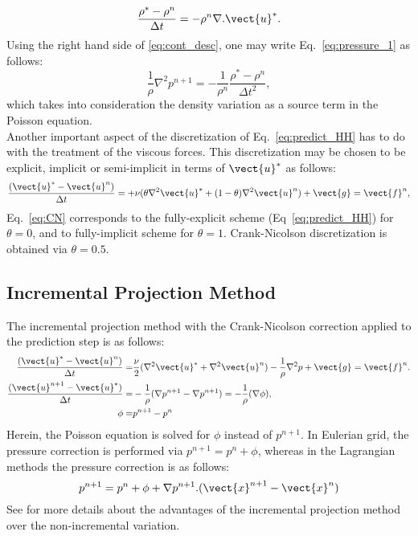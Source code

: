 \begin{equation}\label{eq:cont_desc}
\dfrac{\rho^*-\rho^n}{\Delta t}=-\rho^n \nabla.\vect{u}^*.
\end{equation}
Using the right hand side of \ref{eq:cont_desc}, one may write  Eq.~\ref{eq:pressure_1} as follows:
\begin{equation}\label{eq:pressure_2}
\dfrac{1}{\rho} \nabla^2 p^{n+1}=-\dfrac{1}{\rho^n}\dfrac{\rho^*-\rho^n}{\Delta t^2},
\end{equation}
which takes into consideration the density variation as a source term in the Poisson equation.\\


Another important aspect of the discretization of Eq.~\ref{eq:predict_HH} has to do with the treatment of the viscous forces. This discretization may be chosen to be explicit, implicit or semi-implicit in terms of $\vect{u}^*$  as follows:	
\begin{equation}
\dfrac{(\vect{u}^*-\vect{u}^n)}{\Delta t}=+\nu(\theta \nabla^2\vect{u}^* + (1-\theta)\nabla^2\vect{u}^n)+ \vect{g}=\vect{f}^n\label{eq:CN},
\end{equation}
Eq.~\ref{eq:CN} corresponds to the fully-explicit scheme (Eq~\ref{eq:predict_HH}) for $\theta=0$, and to fully-implicit scheme for $\theta=1$. Crank-Nicolson discretization is obtained via $\theta=0.5$.

\subsection{Incremental Projection Method}
The incremental projection method with the Crank-Nicolson correction applied to the prediction step is as follows:
\begin{align}
\dfrac{(\vect{u}^*-\vect{u}^n)}{\Delta t}=&\frac{\nu}{2}(\nabla^2\vect{u}^* +\nabla^2\vect{u}^n) -\dfrac{1}{\rho} \nabla^2 p+ \vect{g}=\vect{f}^n\label{eq:CN}.\\
\dfrac{(\vect{u}^{n+1}-\vect{u}^*)}{\Delta t}=&-\dfrac{1}{\rho} (\nabla p^{n+1}-\nabla p^{n+1} )=-\dfrac{1}{\rho} (\nabla \phi ) \label{eq:correct_inc},\\
\phi=&p^{n+1}-p^{n}
\end{align}
Herein, the Poisson equation is solved for $\phi$ instead of $p^{n+1}$. In Eulerian grid, the pressure correction is performed via $p^{n+1}=p^{n}+\phi$, whereas in the Lagrangian methods the pressure correction is as follows:
\begin{equation}
p^{n+1}=p^{n}+\phi +\nabla p^{n+1}.(\vect{x}^{n+1}-\vect{x}^{n})
\end{equation}
See \cite{Trask2ndOrder2015,Hosseini2011} for more details about the advantages of the incremental projection method over the non-incremental variation.\\


